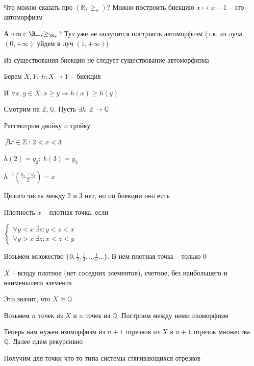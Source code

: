 \documentclass[12pt]{article}
\begin{document}
Что можно сказать про $(\mathbb{R}, \geq_\mathbb{R})$? Можно построить биекцию $x \mapsto x + 1$ -- это автоморфизм

А что с $\R_+, \geq_{\R_+}$? Тут уже не получится построить автоморфизм (т.к. из луча $(0, +\infty)$ уйдем в луч $(1, +\infty)$)

\begin{Remark}{}
    Из существования биекции не следует существование автоморфизма

    Берем $X, Y;\ h : X \to Y$ -- биекция

    И $\forall x, y \in X : x \geq y \Rightarrow h(x) \geq h(y)$

    Смотрим на $\mathbb{Z}, \mathbb{Q}$. Пусть $\exists h : \mathbb{Z} \to \mathbb{Q}$ 

    Рассмотрим двойку и тройку

    $\not\exists x \in \mathbb{Z} : 2 < x < 3$

    $h(2) = y_2;\ h(3) = y_3$

    $h^{-1}(\frac{y_2 + y_3}{2}) = x$

    Целого числа между 2 и 3 нет, но по биекции оно есть
\end{Remark}

\begin{defin}{Плотность}
    $x$ -- плотная точка, если

    $\begin{cases}
        \forall y < x\ \exists z : y < z < x \\
        \forall y > x\ \exists z : x < z < y
    \end{cases}$
\end{defin}

\begin{Example}{}
    Возьмем множество $\{0, \frac{1}{2}, \frac{1}{3}, \ldots \frac{1}{n} \ldots\}$. В нем плотная точка -- только 0
\end{Example}

\begin{theo}{}
    $X$ -- всюду плотное (нет соседних элементов), счетное, без наибольшего и наименьшего элемента

    Это значит, что $X \cong \mathbb{Q}$
\end{theo}

\begin{Proof}{}

Возьмем $n$ точек из $X$ и $n$ точек из $\mathbb{Q}$. Построим между ними изоморфизм

Теперь нам нужен изоморфизм из $n + 1$ отрезков из $X$ в $n + 1$ отрезок множества $\mathbb{Q}$. Далее идем рекурсивно

Получим для точки что-то типа системы стягивающихся отрезков

\end{Proof}
\end{document}
